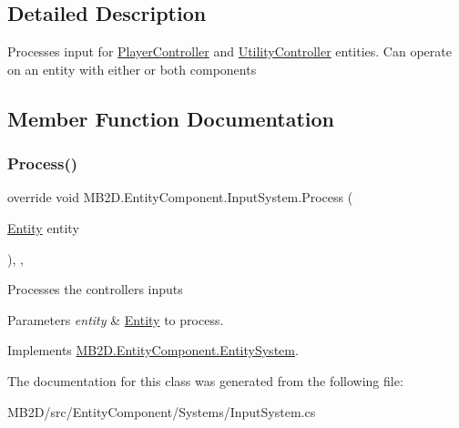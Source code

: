 \subsection{Detailed Description}
Processes input for \hyperlink{class_m_b2_d_1_1_entity_component_1_1_player_controller}{Player\+Controller} and \hyperlink{class_m_b2_d_1_1_entity_component_1_1_utility_controller}{Utility\+Controller} entities. Can operate on an entity with either or both components 



\subsection{Member Function Documentation}
\hypertarget{class_m_b2_d_1_1_entity_component_1_1_input_system_afa241f5c32788fc65587e0443f7217b3}{}\label{class_m_b2_d_1_1_entity_component_1_1_input_system_afa241f5c32788fc65587e0443f7217b3} 
\subsubsection{\texorpdfstring{Process()}{Process()}}
{\footnotesize\ttfamily override void M\+B2\+D.\+Entity\+Component.\+Input\+System.\+Process (\begin{DoxyParamCaption}\item[{\hyperlink{class_m_b2_d_1_1_entity_component_1_1_entity}{Entity}}]{entity }\end{DoxyParamCaption})\hspace{0.3cm}{\ttfamily [inline]}, {\ttfamily [protected]}, {\ttfamily [virtual]}}



Processes the controllers inputs 


\begin{DoxyParams}{Parameters}
{\em entity} & \hyperlink{class_m_b2_d_1_1_entity_component_1_1_entity}{Entity} to process.\\
\hline
\end{DoxyParams}


Implements \hyperlink{class_m_b2_d_1_1_entity_component_1_1_entity_system_abbf83b87cb5d12754fb058cef50451fa}{M\+B2\+D.\+Entity\+Component.\+Entity\+System}.



The documentation for this class was generated from the following file\+:\begin{DoxyCompactItemize}
\item 
M\+B2\+D/src/\+Entity\+Component/\+Systems/Input\+System.\+cs\end{DoxyCompactItemize}
